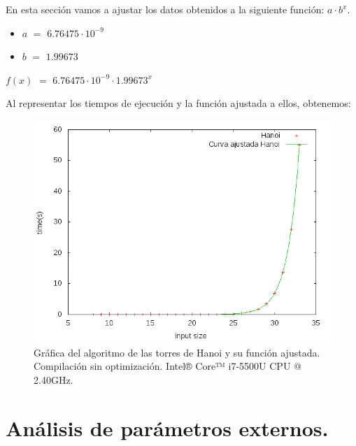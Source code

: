 \documentclass[11pt,a4paper]{article}
\begin{document}
			\par
			En esta sección vamos a ajustar los datos obtenidos a la siguiente función: $a\cdot b^x$.

			\begin{itemize}

					\item
					$a$ $=$ $6.76475\cdot 10^{-9}$
					\item
					$b$ $=$ $1.99673$

			\end{itemize}

			\par
			$f(x)$ $=$ $ 6.76475\cdot 10^{-9}\cdot 1.99673^x$

			\vspace{5mm}

			\par
			Al representar los tiempos de ejecución y la función ajustada a ellos, obtenemos:

			\begin{figure}[h]

				\centering
				\includegraphics[width=1\textwidth]{hanoi_ajustado.png}
				\caption{Gráfica del algoritmo de las torres de Hanoi y su función ajustada. Compilación sin optimización. Intel® Core™ i7-5500U CPU @ 2.40GHz.}

			\end{figure}

\newpage

	\section{Análisis de parámetros externos.}
\end{document}
